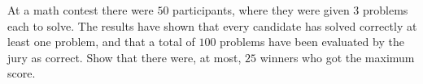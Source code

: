At a math contest there were $ 50 $ participants, where they were given $ 3 $ problems each to solve. The results have shown that every candidate has solved correctly at least one problem, and that a total of $ 100 $ problems have been evaluated by the jury as correct.
Show that there were, at most, $ 25 $ winners who got the maximum score.